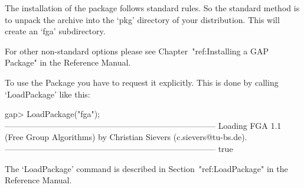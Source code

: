 

\null

The installation of the {\FGA} package follows standard {\GAP} rules.
So the standard method is to unpack the archive into the `pkg'
directory  of your {\GAP} distribution.  This will create an `fga'
subdirectory. 

For other non-standard options please see Chapter~"ref:Installing a
GAP Package" in the {\GAP} Reference Manual.


\null

To use the {\FGA} Package you have to request it explicitly. This  is
done by calling `LoadPackage' like this:

\beginexample
gap> LoadPackage("fga");
-----------------------------------------------------------------------------
Loading  FGA 1.1 (Free Group Algorithms)
by Christian Sievers (c.sievers@tu-bs.de).
-----------------------------------------------------------------------------
true
\endexample

The `LoadPackage' command is described in Section~"ref:LoadPackage"
in the {\GAP} Reference Manual.

